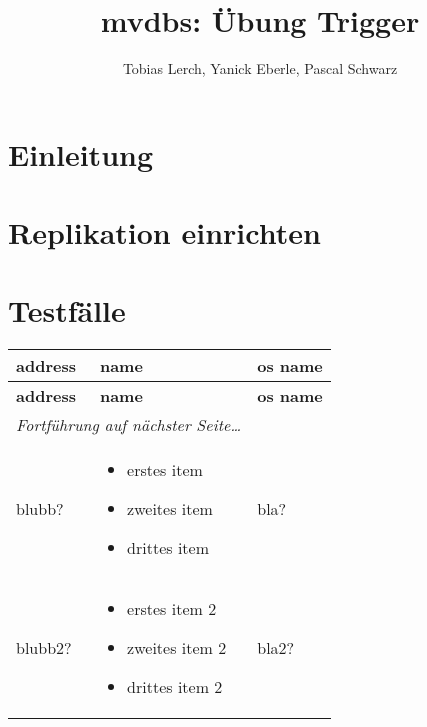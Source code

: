 \documentclass[11pt,a4paper,parskip=half]{scrartcl}
\title{mvdbs: Übung Trigger}
\author{Tobias Lerch, Yanick Eberle, Pascal Schwarz}
\begin{document}
\maketitle

\section{Einleitung}



\section{Replikation einrichten}



\section{Testfälle}
\begin{longtable}{p{2.5cm}|p{8cm}|l}
	\textbf{address} & \textbf{name} & \textbf{os name}\\
	\hline
	\endfirsthead
	\textbf{address} & \textbf{name} & \textbf{os name}\\
	\hline
	\endhead
	\hline
	\multicolumn{2}{l}{\textit{Fortführung auf nächster Seite\ldots}} \\
	\endfoot
	\endlastfoot

	blubb? &
		\vspace{-18pt}
		\begin{itemize}
			\item erstes item
			\item zweites item
			\item drittes item
		\end{itemize}
		\vspace{-18pt} &
	bla? \\ \hline
	
	blubb2? &
		\vspace{-18pt}
		\begin{itemize}
			\item erstes item 2
			\item zweites item 2
			\item drittes item 2
		\end{itemize}
		\vspace{-18pt} &
	bla2? \\ \hline
\end{longtable}
\end{document}
